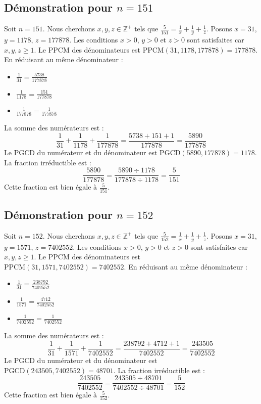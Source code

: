 \documentclass[11pt,a4paper]{article}
\begin{document}
\subsection{Démonstration pour $n = 151$}
Soit $n = 151$. Nous cherchons $x, y, z \in \mathbb{Z}^{+}$ tels que $\frac{5}{151} = \frac{1}{x} + \frac{1}{y} + \frac{1}{z}$.
Posons $x = 31$, $y = 1178$, $z = 177878$.
Les conditions $x > 0$, $y > 0$ et $z > 0$ sont satisfaites car $x, y, z \geq 1$.
Le PPCM des dénominateurs est $\text{PPCM}(31, 1178, 177878) = 177878$.
En réduisant au même dénominateur :
\begin{itemize}
    \item $\frac{1}{31} = \frac{5738}{177878}$
    \item $\frac{1}{1178} = \frac{151}{177878}$
    \item $\frac{1}{177878} = \frac{1}{177878}$
\end{itemize}
La somme des numérateurs est :
$$ \frac{1}{31} + \frac{1}{1178} + \frac{1}{177878} = \frac{5738 + 151 + 1}{177878} = \frac{5890}{177878} $$
Le PGCD du numérateur et du dénominateur est $\text{PGCD}(5890, 177878) = 1178$.
La fraction irréductible est :
$$ \frac{5890}{177878} = \frac{5890 \div 1178}{177878 \div 1178} = \frac{5}{151} $$
Cette fraction est bien égale à $\frac{5}{151}$.

\subsection{Démonstration pour $n = 152$}
Soit $n = 152$. Nous cherchons $x, y, z \in \mathbb{Z}^{+}$ tels que $\frac{5}{152} = \frac{1}{x} + \frac{1}{y} + \frac{1}{z}$.
Posons $x = 31$, $y = 1571$, $z = 7402552$.
Les conditions $x > 0$, $y > 0$ et $z > 0$ sont satisfaites car $x, y, z \geq 1$.
Le PPCM des dénominateurs est $\text{PPCM}(31, 1571, 7402552) = 7402552$.
En réduisant au même dénominateur :
\begin{itemize}
    \item $\frac{1}{31} = \frac{238792}{7402552}$
    \item $\frac{1}{1571} = \frac{4712}{7402552}$
    \item $\frac{1}{7402552} = \frac{1}{7402552}$
\end{itemize}
La somme des numérateurs est :
$$ \frac{1}{31} + \frac{1}{1571} + \frac{1}{7402552} = \frac{238792 + 4712 + 1}{7402552} = \frac{243505}{7402552} $$
Le PGCD du numérateur et du dénominateur est $\text{PGCD}(243505, 7402552) = 48701$.
La fraction irréductible est :
$$ \frac{243505}{7402552} = \frac{243505 \div 48701}{7402552 \div 48701} = \frac{5}{152} $$
Cette fraction est bien égale à $\frac{5}{152}$.
\end{document}
